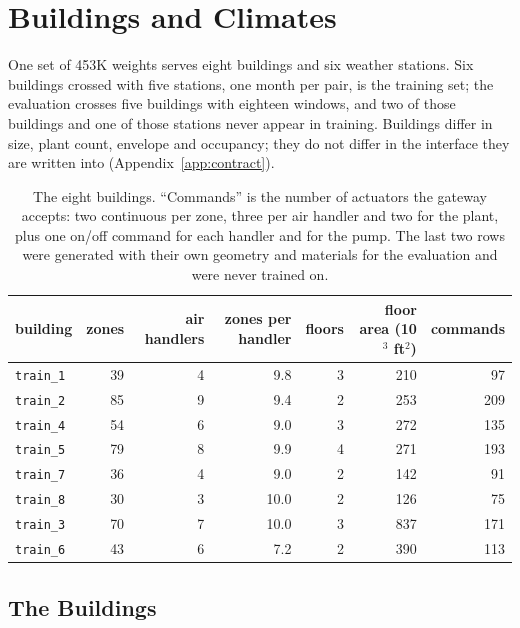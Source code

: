 \documentclass{article}
\begin{document}
\section{Buildings and Climates}
\label{app:buildings}

One set of 453K weights serves eight buildings and six weather stations. Six buildings crossed with five stations, one month per pair, is the training set; the evaluation crosses five buildings with eighteen windows, and two of those buildings and one of those stations never appear in training. Buildings differ in size, plant count, envelope and occupancy; they do not differ in the interface they are written into (Appendix~\ref{app:contract}).

\begin{table}[h!]
\centering
\small
\begin{tabular}{@{}lrrrrrr@{}}
\toprule
building & zones & air handlers & zones per handler & floors & floor area (10$^3$ ft$^2$) & commands \\
\midrule
\texttt{train\_1} & 39 & 4 & 9.8 & 3 & 210 & 97 \\
\texttt{train\_2} & 85 & 9 & 9.4 & 2 & 253 & 209 \\
\texttt{train\_4} & 54 & 6 & 9.0 & 3 & 272 & 135 \\
\texttt{train\_5} & 79 & 8 & 9.9 & 4 & 271 & 193 \\
\texttt{train\_7} & 36 & 4 & 9.0 & 2 & 142 & 91 \\
\texttt{train\_8} & 30 & 3 & 10.0 & 2 & 126 & 75 \\
\midrule
\texttt{train\_3} & 70 & 7 & 10.0 & 3 & 837 & 171 \\
\texttt{train\_6} & 43 & 6 & 7.2 & 2 & 390 & 113 \\
\bottomrule
\end{tabular}
\vspace{4pt}
\caption{The eight buildings. ``Commands'' is the number of actuators the gateway accepts: two continuous per zone, three per air handler and two for the plant, plus one on/off command for each handler and for the pump. The last two rows were generated with their own geometry and materials for the evaluation and were never trained on.}
\label{tab:app_buildings}
\end{table}

\subsection{The Buildings}
\label{app:building_text}
\end{document}

